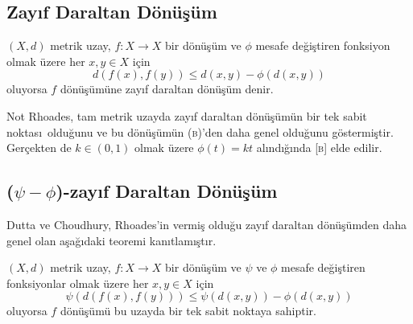 \documentclass[8pt]{beamer}
\begin{document}
\subsection{Zay\i f Daraltan D\"{o}n\"{u}\c{s}\"{u}m}
\begin{frame}
  \begin{definition}
     $(X,d)$ metrik uzay, $f: X \rightarrow X$ bir d\"{o}n\"{u}\c{s}\"{u}m ve $\phi$ mesafe de\u{g}i\c{s}tiren fonksiyon olmak \"uzere her $x, y\in X$ i\c{c}in
     \begin{equation*}
       d(f(x),f(y))\leq d(x,y)-\phi(d(x,y))
     \end{equation*}
oluyorsa $f$ d\"{o}n\"{u}\c{s}\"{u}m\"{u}ne zay\i f daraltan d\"{o}n\"{u}\c{s}\"{u}m denir.
  \end{definition}
  \begin{block}{Not}
    Rhoades\cite{Rhoades2001}, tam metrik uzayda zay\i f daraltan
    d\"{o}n\"{u}\c{s}\"{u}m\"un bir tek sabit noktas\i \ oldu\u{g}unu
    ve bu d\"{o}n\"{u}\c{s}\"{u}m\"un \textsc{(b)}'den daha genel
    oldu\u{g}unu g\"ostermi\c{s}tir. Ger\c{c}ekten de $k\in(0,1)$
    olmak \"uzere $\phi(t)=kt$ al\i nd\i \u{g}\i nda \textsc{[b]} elde
    edilir.
  \end{block}

\end{frame}

\subsection{($\psi-\phi$)-zay\i f Daraltan D\"{o}n\"{u}\c{s}\"{u}m}
\begin{frame}
Dutta ve Choudhury\cite{Dutta2008}, Rhoades\cite{Rhoades2001}'in vermi\c{s} oldu\u{g}u zay\i f daraltan d\"{o}n\"{u}\c{s}\"{u}mden daha genel olan a\c{s}a\u{g}\i daki teoremi kan\i tlam\i \c{s}t\i r.
  \begin{definition}
     $(X,d)$ metrik uzay, $f: X \rightarrow X$ bir d\"{o}n\"{u}\c{s}\"{u}m ve $\psi$ ve $\phi$ mesafe de\u{g}i\c{s}tiren fonksiyonlar olmak \"uzere her $x, y\in X$ i\c{c}in
     \begin{equation*}
       \psi(d(f(x),f(y)))\leq \psi(d(x,y))-\phi(d(x,y))
     \end{equation*}
oluyorsa $f$ d\"{o}n\"{u}\c{s}\"{u}m\"{u} bu uzayda bir tek sabit noktaya sahiptir.
  \end{definition}
\end{frame}
\end{document}
